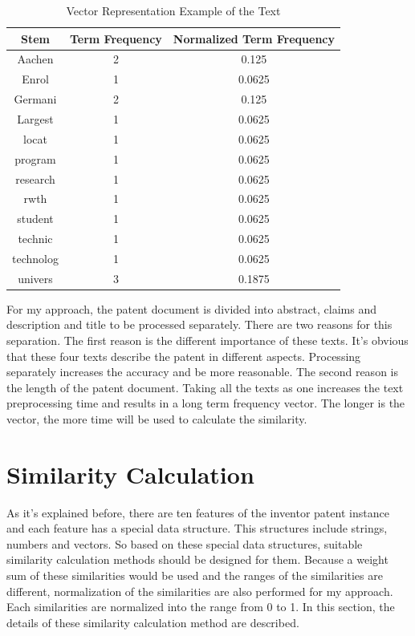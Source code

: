 \begin{table}

\begin{center}
\begin{tabular}{ | c | c | c |}
\hline
  Stem  & Term Frequency & Normalized Term Frequency \\ \hline
  Aachen & 2 & 0.125 \\ \hline
  Enrol & 1 & 0.0625\\ \hline
  Germani & 2 &  0.125\\ \hline
  Largest & 1& 0.0625\\ \hline
  locat & 1 &0.0625\\ \hline
  program & 1&0.0625\\ \hline
  research & 1& 0.0625\\ \hline
  rwth & 1 &0.0625\\ \hline
  student & 1 &0.0625\\ \hline
  technic & 1 &0.0625\\ \hline
  technolog & 1 &0.0625\\ \hline
  univers & 3 & 0.1875\\ 
  \hline
\end{tabular}
\end{center}
\caption{Vector Representation Example of the Text}
\end{table}

For my approach, the patent document is divided into abstract, claims and description and title to be processed separately. There are two reasons for this separation. The first reason is the different importance of these texts. It's obvious that these four texts describe the patent in different aspects. Processing separately increases the accuracy and be more reasonable. The second reason is the length of the patent document. Taking all the texts as one increases the text preprocessing time and results in a long term frequency vector. The longer is the vector, the more time will be used to calculate the similarity. 

\section{Similarity Calculation}
As it's explained before, there are ten features of the inventor patent instance and each feature has a special data structure. This structures include strings, numbers and vectors. So based on these special data structures, suitable similarity calculation methods should  be designed for them. Because a weight sum of these similarities would be used and the ranges of the similarities are different, normalization of the similarities are also performed for my approach. Each similarities are normalized into the range from 0 to 1. In this section, the details of these similarity calculation method are described.


